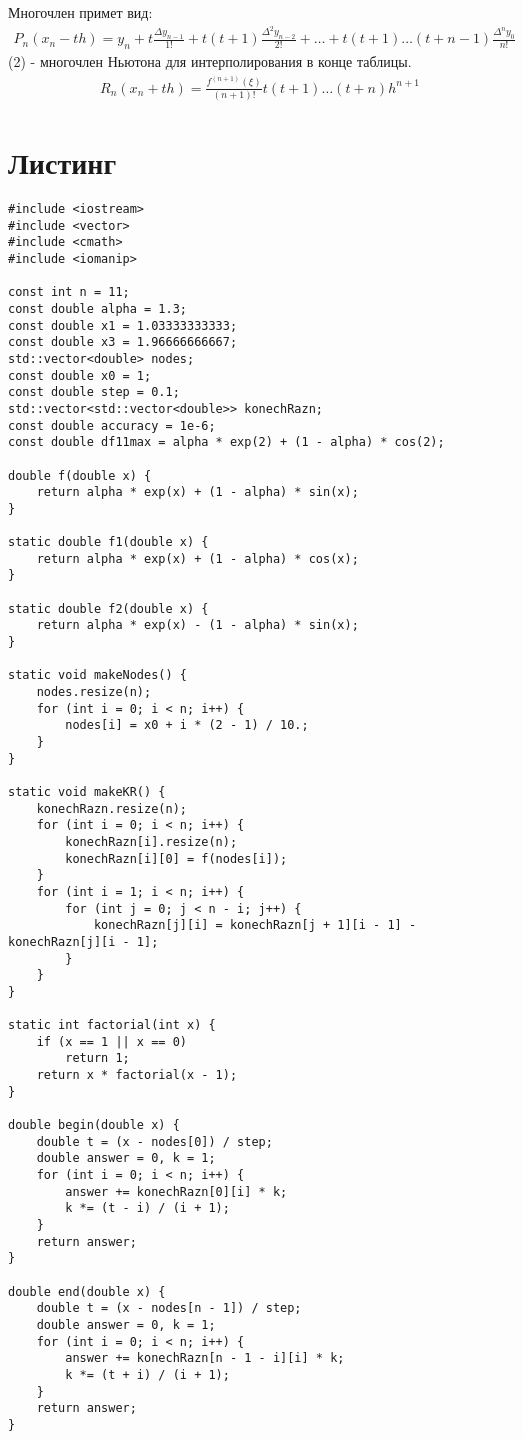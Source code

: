 \documentclass[10pt]{scrartcl}
\makeatletter
\newcommand{\verbatimfont}[1]{\renewcommand{\verbatim@font}{\ttfamily#1}}
\makeatother
\begin{document}
Многочлен примет вид:
\begin{gather}
P_n(x_n - th) = y_n + t\frac{\Delta y_{n - 1}}{1!} + t(t + 1)\frac{\Delta^2 y_{n - 2}}{2!} + \dots +
t(t + 1)\dots(t + n - 1)\frac{\Delta^n y_0}{n!}
\end{gather}
(2) - многочлен Ньютона для интерполирования в конце таблицы.
\begin{gather*}
R_n(x_n + th) = \frac{f^{(n + 1)}(\xi)}{(n + 1)!}t(t + 1)\dots(t + n)h^{n + 1}
\end{gather*}
\section*{Листинг}
\verbatimfont{\small}
\begin{verbatim}
#include <iostream>
#include <vector>
#include <cmath>
#include <iomanip>

const int n = 11;
const double alpha = 1.3;
const double x1 = 1.03333333333;
const double x3 = 1.96666666667;
std::vector<double> nodes;
const double x0 = 1;
const double step = 0.1;
std::vector<std::vector<double>> konechRazn;
const double accuracy = 1e-6;
const double df11max = alpha * exp(2) + (1 - alpha) * cos(2);

double f(double x) {
    return alpha * exp(x) + (1 - alpha) * sin(x);
}

static double f1(double x) {
    return alpha * exp(x) + (1 - alpha) * cos(x);
}

static double f2(double x) {
    return alpha * exp(x) - (1 - alpha) * sin(x);
}

static void makeNodes() {
    nodes.resize(n);
    for (int i = 0; i < n; i++) {
        nodes[i] = x0 + i * (2 - 1) / 10.;
    }
}

static void makeKR() {
    konechRazn.resize(n);
    for (int i = 0; i < n; i++) {
        konechRazn[i].resize(n);
        konechRazn[i][0] = f(nodes[i]);
    }
    for (int i = 1; i < n; i++) {
        for (int j = 0; j < n - i; j++) {
            konechRazn[j][i] = konechRazn[j + 1][i - 1] - konechRazn[j][i - 1];
        }
    }
}

static int factorial(int x) {
    if (x == 1 || x == 0)
        return 1;
    return x * factorial(x - 1);
}

double begin(double x) {
    double t = (x - nodes[0]) / step;
    double answer = 0, k = 1;
    for (int i = 0; i < n; i++) {
        answer += konechRazn[0][i] * k;
        k *= (t - i) / (i + 1);
    }
    return answer;
}

double end(double x) {
    double t = (x - nodes[n - 1]) / step;
    double answer = 0, k = 1;
    for (int i = 0; i < n; i++) {
        answer += konechRazn[n - 1 - i][i] * k;
        k *= (t + i) / (i + 1);
    }
    return answer;
}


\end{verbatim}
\end{document}
